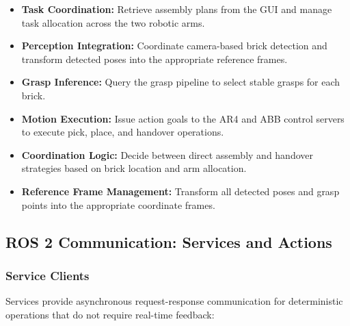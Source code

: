 \begin{itemize}
    \item \textbf{Task Coordination:} Retrieve assembly plans from the GUI and manage task allocation across the two robotic arms.
    \item \textbf{Perception Integration:} Coordinate camera-based brick detection and transform detected poses into the appropriate reference frames.
    \item \textbf{Grasp Inference:} Query the grasp pipeline to select stable grasps for each brick.
    \item \textbf{Motion Execution:} Issue action goals to the AR4 and ABB control servers to execute pick, place, and handover operations.
    \item \textbf{Coordination Logic:} Decide between direct assembly and handover strategies based on brick location and arm allocation.
    \item \textbf{Reference Frame Management:} Transform all detected poses and grasp points into the appropriate coordinate frames.
\end{itemize}

\subsection{ROS 2 Communication: Services and Actions}

\subsubsection{Service Clients}

Services provide asynchronous request-response communication for deterministic operations that do not require real-time feedback:


